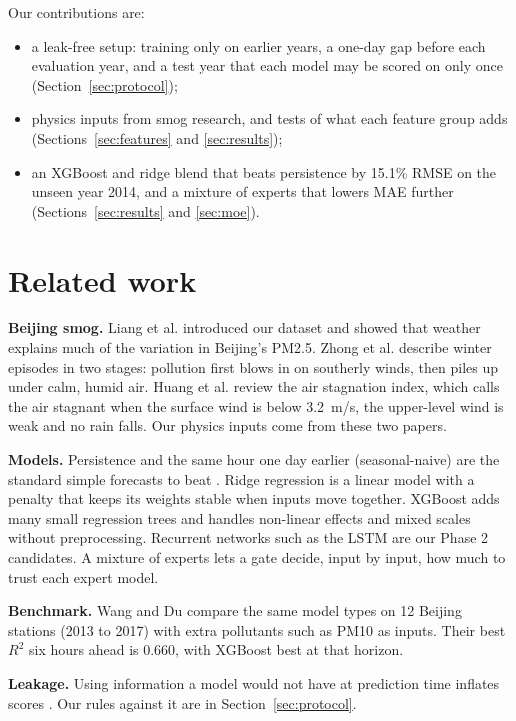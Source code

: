 \documentclass[conference]{IEEEtran}
\begin{document}
Our contributions are:
\begin{itemize}
\item a leak-free setup: training only on earlier years, a one-day gap before each evaluation year, and a test year that each model may be scored on only once (Section~\ref{sec:protocol});
\item physics inputs from smog research, and tests of what each feature group adds (Sections~\ref{sec:features} and \ref{sec:results});
\item an XGBoost and ridge blend that beats persistence by 15.1\% RMSE on the unseen year 2014, and a mixture of experts that lowers MAE further (Sections~\ref{sec:results} and \ref{sec:moe}).
\end{itemize}

\section{Related work}
\label{sec:related}
\textbf{Beijing smog.} Liang et al. \cite{liang2015} introduced our dataset and showed that weather explains much of the variation in Beijing's PM2.5. Zhong et al. \cite{zhong2018} describe winter episodes in two stages: pollution first blows in on southerly winds, then piles up under calm, humid air. Huang et al. \cite{huang2018} review the air stagnation index, which calls the air stagnant when the surface wind is below 3.2~m/s, the upper-level wind is weak and no rain falls. Our physics inputs come from these two papers.

\textbf{Models.} Persistence and the same hour one day earlier (seasonal-naive) are the standard simple forecasts to beat \cite{hyndman2021}. Ridge regression \cite{hoerl1970} is a linear model with a penalty that keeps its weights stable when inputs move together. XGBoost \cite{chen2016} adds many small regression trees and handles non-linear effects and mixed scales without preprocessing. Recurrent networks such as the LSTM \cite{hochreiter1997} are our Phase 2 candidates. A mixture of experts \cite{jacobs1991} lets a gate decide, input by input, how much to trust each expert model.

\textbf{Benchmark.} Wang and Du \cite{wang2026} compare the same model types on 12 Beijing stations (2013 to 2017) with extra pollutants such as PM10 as inputs. Their best $R^2$ six hours ahead is 0.660, with XGBoost best at that horizon.

\textbf{Leakage.} Using information a model would not have at prediction time inflates scores \cite{kaufman2012}. Our rules against it are in Section~\ref{sec:protocol}.
\end{document}

